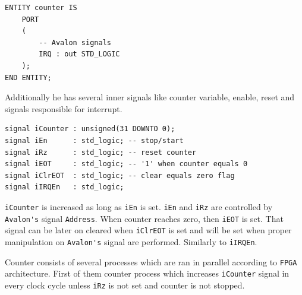 \begin{verbatim}
ENTITY counter IS
    PORT
    (
        -- Avalon signals
        IRQ : out STD_LOGIC
    );
END ENTITY;
\end{verbatim}
Additionally he has several inner signals like counter variable, enable, reset and signals responsible for interrupt.
\begin{verbatim}
signal iCounter : unsigned(31 DOWNTO 0);
signal iEn      : std_logic; -- stop/start
signal iRz      : std_logic; -- reset counter
signal iEOT     : std_logic; -- '1' when counter equals 0
signal iClrEOT  : std_logic; -- clear equals zero flag
signal iIRQEn   : std_logic;
\end{verbatim}
\verb|iCounter| is increased as long as \verb|iEn| is set. \verb|iEn| and \verb|iRz| are controlled by \verb|Avalon's| signal \verb|Address|. When counter reaches zero, then \verb|iEOT| is set. That signal can be later on cleared when \verb|iClrEOT| is set and will be set when proper manipulation on \verb|Avalon's| signal are performed. Similarly to \verb|iIRQEn|.

Counter consists of several processes which are ran in parallel according to \verb|FPGA| architecture. First of them counter process which increases \verb|iCounter| signal in every clock cycle unless \verb|iRz| is not set and counter is not stopped. 

